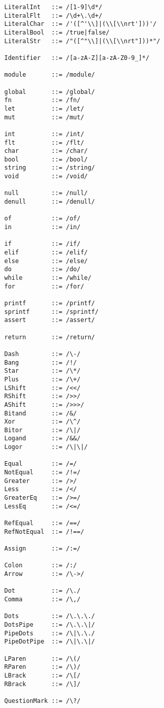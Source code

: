 \documentclass{article}
\begin{document}
			\begin{verbatim}
				LiteralInt   ::= /[1-9]\d*/
				LiteralFlt   ::= /\d+\.\d+/
				LiteralChar  ::= /'([^'\\]|(\\[\\nrt']))'/
				LiteralBool  ::= /true|false/
				LiteralStr   ::= /"([^"\\]|(\\[\\nrt"]))*"/
				
				Identifier   ::= /[a-zA-Z][a-zA-Z0-9_]*/
				
				module       ::= /module/
				
				global       ::= /global/
				fn           ::= /fn/
				let          ::= /let/
				mut          ::= /mut/
				
				int          ::= /int/
				flt          ::= /flt/
				char         ::= /char/
				bool         ::= /bool/
				string       ::= /string/
				void         ::= /void/
				
				null         ::= /null/
				denull       ::= /denull/
				
				of           ::= /of/
				in           ::= /in/
				
				if           ::= /if/
				elif         ::= /elif/
				else         ::= /else/
				do           ::= /do/
				while        ::= /while/
				for          ::= /for/
				
				printf       ::= /printf/
				sprintf      ::= /sprintf/
				assert       ::= /assert/
				 
				return       ::= /return/
				
				Dash         ::= /\-/
				Bang         ::= /!/
				Star         ::= /\*/
				Plus         ::= /\+/
				LShift       ::= /<</
				RShift       ::= />>/
				AShift       ::= />>>/
				Bitand       ::= /&/
				Xor          ::= /\^/
				Bitor        ::= /\|/
				Logand       ::= /&&/
				Logor        ::= /\|\|/
				
				Equal        ::= /=/
				NotEqual     ::= /!=/
				Greater      ::= />/
				Less         ::= /</
				GreaterEq    ::= />=/
				LessEq       ::= /<=/
				
				RefEqual     ::= /==/
				RefNotEqual  ::= /!==/
				
				Assign       ::= /:=/
				
				Colon        ::= /:/
				Arrow        ::= /\->/
				
				Dot          ::= /\./
				Comma        ::= /\,/
				
				Dots         ::= /\.\.\./
				DotsPipe     ::= /\.\.\|/
				PipeDots     ::= /\|\.\./
				PipeDotPipe  ::= /\|\.\|/
				
				LParen       ::= /\(/
				RParen       ::= /\)/
				LBrack       ::= /\[/
				RBrack       ::= /\]/
				
				QuestionMark ::= /\?/
			\end{verbatim}
			
\end{document}
